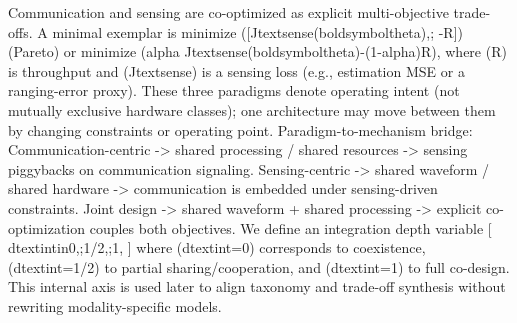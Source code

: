 {} Communication and sensing are co-optimized as explicit multi-objective trade-offs. A minimal exemplar is minimize ([J\markdownRendererUnderscore{}\markdownRendererLeftBrace{}\markdownRendererBackslash{}text\markdownRendererLeftBrace{}sense\markdownRendererRightBrace{}\markdownRendererRightBrace{}(\markdownRendererBackslash{}boldsymbol\markdownRendererLeftBrace{}\markdownRendererBackslash{}theta\markdownRendererRightBrace{}),; -R]) (Pareto) or minimize (\markdownRendererBackslash{}alpha J\markdownRendererUnderscore{}\markdownRendererLeftBrace{}\markdownRendererBackslash{}text\markdownRendererLeftBrace{}sense\markdownRendererRightBrace{}\markdownRendererRightBrace{}(\markdownRendererBackslash{}boldsymbol\markdownRendererLeftBrace{}\markdownRendererBackslash{}theta\markdownRendererRightBrace{})-(1-\markdownRendererBackslash{}alpha)R), where (R) is throughput and (J\markdownRendererUnderscore{}\markdownRendererLeftBrace{}\markdownRendererBackslash{}text\markdownRendererLeftBrace{}sense\markdownRendererRightBrace{}\markdownRendererRightBrace{}) is a sensing loss (e.g., estimation MSE or a ranging-error proxy).\markdownRendererParagraphSeparator
{}These three paradigms denote operating intent (not mutually exclusive hardware classes); one architecture may move between them by changing constraints or operating point.\markdownRendererParagraphSeparator
{}Paradigm-to-mechanism bridge:\markdownRendererInterblockSeparator
{}\markdownRendererUlBeginTight
\markdownRendererUlItem Communication-centric -> shared processing / shared resources -> sensing piggybacks on communication signaling.\markdownRendererUlItemEnd 
\markdownRendererUlItem Sensing-centric -> shared waveform / shared hardware -> communication is embedded under sensing-driven constraints.\markdownRendererUlItemEnd 
\markdownRendererUlItem Joint design -> shared waveform + shared processing -> explicit co-optimization couples both objectives.\markdownRendererUlItemEnd 
\markdownRendererUlEndTight \markdownRendererInterblockSeparator
{}We define an integration depth variable\markdownRendererSoftLineBreak
{}[\markdownRendererSoftLineBreak
{}d\markdownRendererUnderscore{}\markdownRendererLeftBrace{}\markdownRendererBackslash{}text\markdownRendererLeftBrace{}int\markdownRendererRightBrace{}\markdownRendererRightBrace{}\markdownRendererBackslash{}in\markdownRendererLeftBrace{}0,;1/2,;1\markdownRendererRightBrace{},\markdownRendererSoftLineBreak
{}]\markdownRendererSoftLineBreak
{}where (d\markdownRendererUnderscore{}\markdownRendererLeftBrace{}\markdownRendererBackslash{}text\markdownRendererLeftBrace{}int\markdownRendererRightBrace{}\markdownRendererRightBrace{}=0) corresponds to coexistence, (d\markdownRendererUnderscore{}\markdownRendererLeftBrace{}\markdownRendererBackslash{}text\markdownRendererLeftBrace{}int\markdownRendererRightBrace{}\markdownRendererRightBrace{}=1/2) to partial sharing/cooperation, and (d\markdownRendererUnderscore{}\markdownRendererLeftBrace{}\markdownRendererBackslash{}text\markdownRendererLeftBrace{}int\markdownRendererRightBrace{}\markdownRendererRightBrace{}=1) to full co-design. This internal axis is used later to align taxonomy and trade-off synthesis without rewriting modality-specific models.\markdownRendererParagraphSeparator
